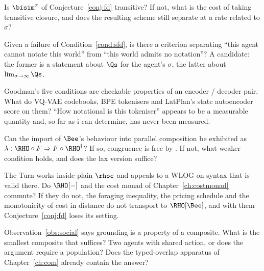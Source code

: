 \begin{question}
\label{q:trans}
Is $\bisim^{\sigma}$ of Conjecture~\ref{conj:fd} transitive?
If not, what is the cost of taking transitive closure, and does the
resulting scheme still separate at a rate related to $\sigma$?
\end{question}

\begin{question}
\label{q:density}
Given a failure of Condition~\ref{cond:sfd}, is there a criterion
separating ``this agent cannot notate this world'' from ``this
world admits no notation''?
A candidate: the former is a statement about $\Qs$ for the agent's
$\sigma$, the latter about $\lim_{\sigma \to \infty} \Qs$.
\end{question}

\begin{question}
\label{q:codebooks}
Goodman's five conditions are checkable properties of an
encoder / decoder pair.
What do VQ-VAE codebooks, BPE tokenisers and LatPlan's state
autoencoder score on them?
``How notational is this tokeniser'' appears to be a measurable
quantity and, so far as i can determine, has never been measured.
\end{question}

\begin{question}
\label{q:gsos}
Can the import of $\Bee$'s behaviour into parallel composition be
exhibited as $\lambda : \RHO \circ F \Rightarrow F \circ
\RHO^{\dagger}$?
If so, congruence is free by \cite{turiplotkin}.
If not, what weaker condition holds, and does the lax version
suffice?
\end{question}

\begin{question}
\label{q:monad}
The Turn works inside plain $\rhoc$ and appeals to a WLOG on syntax
that is valid there.
Do $\RHO[-]$ and the cost monad of Chapter~\ref{ch:costmonad}
commute?
If they do not, the foraging inequality, the pricing schedule and
the monotonicity of cost in distance do not transport to
$\RHO[\Bee]$, and with them Conjecture~\ref{conj:fd} loses its
setting.
\end{question}

\begin{question}
\label{q:social}
Observation~\ref{obs:social} says grounding is a property of a
composite.
What is the smallest composite that suffices?
Two agents with shared action, or does the argument require a
population?
Does the typed-overlap apparatus of Chapter~\ref{ch:com} already
contain the answer?
\end{question}


